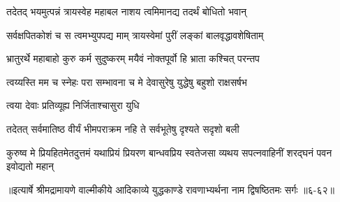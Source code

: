 \twolineshloka
{तदेतद् भयमुत्पन्नं त्रायस्वेह महाबल}
{नाशय त्वमिमानद्य तदर्थं बोधितो भवान्} %

\twolineshloka
{सर्वक्षपितकोशं च स त्वमभ्युपपद्य माम्}
{त्रायस्वेमां पुरीं लङ्कां बालवृद्धावशेषिताम्} %

\twolineshloka
{भ्रातुरर्थे महाबाहो कुरु कर्म सुदुष्करम्}
{मयैवं नोक्तपूर्वो हि भ्राता कश्चित् परन्तप} %

\twolineshloka
{त्वय्यस्ति मम च स्नेहः परा सम्भावना च मे}
{देवासुरेषु युद्धेषु बहुशो राक्षसर्षभ} %

\onelineshloka
{त्वया देवाः प्रतिव्यूह्य निर्जिताश्चासुरा युधि} %

\twolineshloka
{तदेतत् सर्वमातिष्ठ वीर्यं भीमपराक्रम}
{नहि ते सर्वभूतेषु दृश्यते सदृशो बली} %

\twolineshloka
{कुरुष्व मे प्रियहितमेतदुत्तमं यथाप्रियं प्रियरण बान्धवप्रिय}
{स्वतेजसा व्यथय सपत्नवाहिनीं शरद्घनं पवन इवोद्यतो महान्} %


॥इत्यार्षे श्रीमद्रामायणे वाल्मीकीये आदिकाव्ये युद्धकाण्डे रावणाभ्यर्थना नाम द्विषष्ठितमः सर्गः ॥६-६२॥
